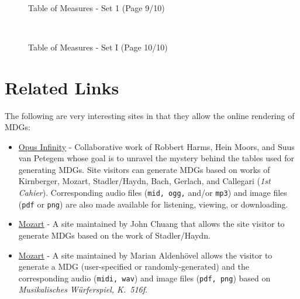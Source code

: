 \documentclass[a4paper,x11names,svgnames,10pt]{article}
\begin{document}
{${}_{}$\\
\vspace*{0.5in}
\begin{figure}[H]
	\centering
	\def\svgwidth{0.975\columnwidth}
	 	
	\caption{Table of Measures - Set 1 (Page 9/10)}
	\label{fig:meas9}
\end{figure}

${}_{}$\\
\vspace*{0.5in}
\begin{figure}[H]
	\centering
	\def\svgwidth{0.975\columnwidth}
	 	
	\caption{Table of Measures - Set I (Page 10/10)}
	\label{fig:meas10}
\end{figure}


\section{Related Links}
The following are very interesting sites in that they allow the online rendering of MDGs:
\begin{itemize}
	\item \href{https://opus-infinity.org}{Opus Infinity} - Collaborative work of Robbert Harms, Hein Moors, and Suus van Petegem whose goal is to unravel the mystery behind the tables used for generating MDGs.  Site visitors can generate MDGs based on works of Kirnberger, Mozart, Stadler/Haydn, Bach, Gerlach, and Callegari ({\it 1st Cahier}).  Corresponding audio files ({\tt mid, ogg,} and/or {\tt mp3}) and image files ({\tt pdf} or {\tt png}) are also made available for listening, viewing, or downloading.
	
	\item  \href{http://sunsite.univie.ac.at/Mozart/dice/}{Mozart} - A site maintained by John Chuang that allows the site visitor to generate MDGs based on the work of Stadler/Haydn.
	
	\item  \href{https://marian-aldenhoevel.de/mozart/}{Mozart} - A site maintained by Marian Aldenh\"{o}vel allows the visitor to generate a MDG (user-specified or randomly-generated) and the corresponding audio ({\tt midi, wav}) and image files ({\tt pdf, png}) based on {\em Musikalisches W\"{u}rferspiel, K.\ 516f}.
	

\end{itemize}}
\end{document}
